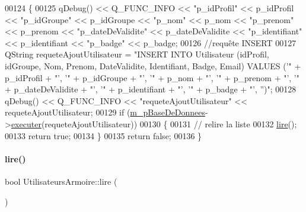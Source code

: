 \begin{DoxyCode}
00124 \{
00125     qDebug() << Q\_FUNC\_INFO << \textcolor{stringliteral}{"p\_idProfil"} << p\_idProfil << \textcolor{stringliteral}{"p\_idGroupe"} << p\_idGroupe << \textcolor{stringliteral}{"p\_nom"} << p\_nom
       << \textcolor{stringliteral}{"p\_prenom"} << p\_prenom << \textcolor{stringliteral}{"p\_dateDeValidite"} << p\_dateDeValidite << \textcolor{stringliteral}{"p\_identifiant"} << p\_identifiant << \textcolor{stringliteral}{
      "p\_badge"} << p\_badge;
00126     \textcolor{comment}{//requête INSERT}
00127     QString requeteAjoutUtilisateur = \textcolor{stringliteral}{"INSERT INTO Utilisateur (idProfil, idGroupe, Nom, Prenom,
       DateValidite, Identifiant, Badge, Email) VALUES ('"} + p\_idProfil + \textcolor{stringliteral}{"', '"} + p\_idGroupe + \textcolor{stringliteral}{"', '"} + p\_nom + \textcolor{stringliteral}{"', '"} + 
      p\_prenom + \textcolor{stringliteral}{"', '"} + p\_dateDeValidite + \textcolor{stringliteral}{"', '"} + p\_identifiant + \textcolor{stringliteral}{"', '"} + p\_badge + \textcolor{stringliteral}{"', '')"};
00128     qDebug() << Q\_FUNC\_INFO << \textcolor{stringliteral}{"requeteAjoutUtilisateur"} << requeteAjoutUtilisateur;
00129     \textcolor{keywordflow}{if} (\hyperlink{class_utilisateurs_armoire_ac43b4894f5036117d044ad2d22b09318}{m\_pBaseDeDonnees}->\hyperlink{class_base_de_donnees_aa8de5f8f8bb17edc43f5c0ee33712081}{executer}(requeteAjoutUtilisateur))
00130     \{
00131         \textcolor{comment}{// relire la liste}
00132         \hyperlink{class_utilisateurs_armoire_a10b2038874606c0afccf0f18c038dd0c}{lire}();
00133         \textcolor{keywordflow}{return} \textcolor{keyword}{true};
00134     \}
00135     \textcolor{keywordflow}{return} \textcolor{keyword}{false};
00136 \}
\end{DoxyCode}
\mbox{\label{class_utilisateurs_armoire_a10b2038874606c0afccf0f18c038dd0c}} 
\paragraph{\texorpdfstring{lire()}{lire()}}
{\footnotesize\ttfamily bool Utilisateurs\+Armoire\+::lire (\begin{DoxyParamCaption}{ }\end{DoxyParamCaption})}



